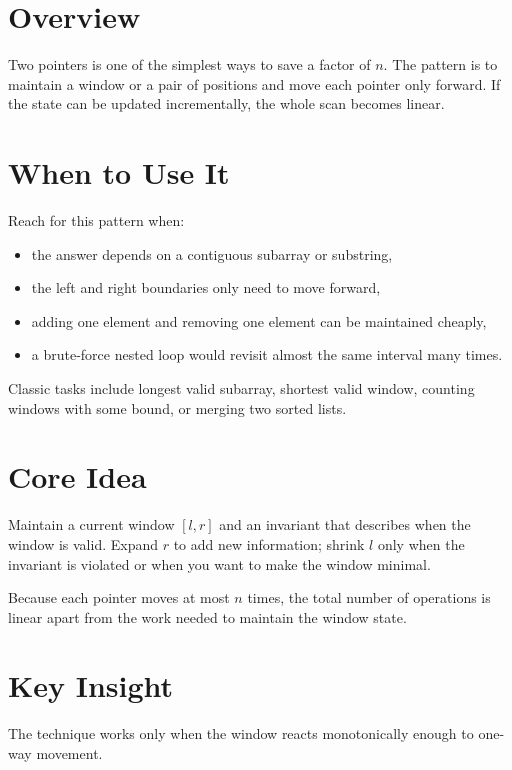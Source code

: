 \section*{Overview}

Two pointers is one of the simplest ways to save a factor of \(n\). The pattern is to maintain a window or a pair of
positions and move each pointer only forward. If the state can be updated incrementally, the whole scan becomes linear.

\section*{When to Use It}

Reach for this pattern when:

\begin{itemize}
  \item the answer depends on a contiguous subarray or substring,
  \item the left and right boundaries only need to move forward,
  \item adding one element and removing one element can be maintained cheaply,
  \item a brute-force nested loop would revisit almost the same interval many times.
\end{itemize}

Classic tasks include longest valid subarray, shortest valid window, counting windows with some bound, or merging two
sorted lists.

\section*{Core Idea}

Maintain a current window \([l, r]\) and an invariant that describes when the window is valid. Expand \(r\) to add new
information; shrink \(l\) only when the invariant is violated or when you want to make the window minimal.

Because each pointer moves at most \(n\) times, the total number of operations is linear apart from the work needed to
maintain the window state.

\section*{Key Insight}

The technique works only when the window reacts monotonically enough to one-way movement.

